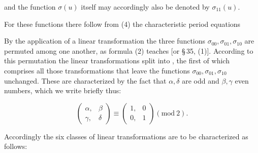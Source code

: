 and the function $\sigma(u)$ itself may accordingly also be denoted by $\sigma_{11}(u)$.

For these functions there follow from (4) the characteristic period equations


By the application of a linear transformation the three functions $\sigma_{00}, \sigma_{01}, \sigma_{10}$ are permuted among one another, as formula (2) teaches [or \S\,35, (1)]. According to this permutation the linear transformations split into , the first of which comprises all those transformations that leave the functions $\sigma_{00}, \sigma_{01}, \sigma_{10}$ unchanged. These are characterized by the fact that $\alpha, \delta$ are odd and $\beta, \gamma$ even numbers, which we write briefly thus:

\[
\begin{pmatrix}\alpha, & \beta\\ \gamma, & \delta\end{pmatrix} \equiv \begin{pmatrix}1, & 0\\ 0, & 1\end{pmatrix} (\mathrm{mod}\ 2).
\]

Accordingly the six classes of linear transformations are to be characterized as follows:

